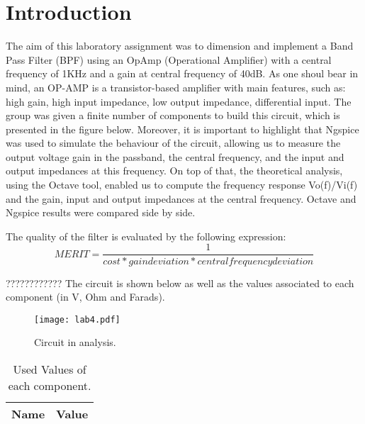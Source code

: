 \section{Introduction}
\label{introduction}


\par The aim of this laboratory assignment was to dimension and implement a Band Pass Filter (BPF) using an OpAmp (Operational Amplifier) with a central frequency of 1KHz and a gain at central frequency of 40dB. As one shoul bear in mind, an OP-AMP is a transistor-based amplifier with main features, such as: high gain, high input impedance, low output impedance, differential input. The group was given a finite number of components to build this circuit, which is presented in the figure below. Moreover, it is important to highlight that Ngspice was used to simulate the behaviour of the circuit, allowing us to measure the output voltage gain in the passband, the central frequency, and the input and output impedances at this frequency. On top of that, the theoretical analysis, using the Octave tool, enabled us to compute the frequency response Vo(f)/Vi(f) and the gain, input and output impedances at the central frequency. Octave and Ngspice results were compared side by side.


\par The quality of the filter is evaluated by the following expression:
\begin {equation}
	 MERIT = \frac{1}{cost * gain deviation * central frequency deviation}   	
	\label{merit}
\end{equation}


????????????
The circuit is shown below as well as the values associated to each component (in V, Ohm and Farads).

\begin{figure}[ht] \centering
\texttt{[image: lab4.pdf]}
\caption{Circuit in analysis.}
\label{circuito todo}
\end{figure}


\begin{table}[ht]
  \centering
  \begin{tabular}{|l|r|}
    \hline    
    {\bf Name} & {\bf Value} \\ \hline
    
  \end{tabular}
  \caption{Used Values of each component.}
  \label{tab:3}
\end{table}


\newpage


